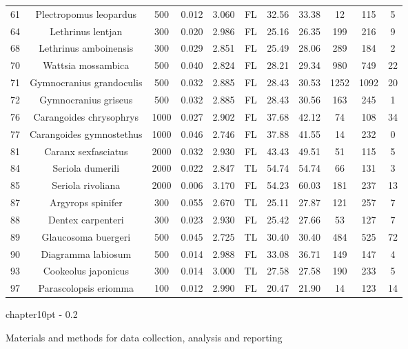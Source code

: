 \documentclass{report}\usepackage[]{graphicx}\usepackage[]{color}
\makeatletter
\renewcommand\chapter{\@startsection%
{chapter}{1}{0pt}%
{-\baselineskip}%
{0.2\baselineskip}%
{\raggedright\bf}}%
\makeatother
\begin{document}
\begin{table}[ht]
{\begin{tabular}{ccccccccccc}
  61 & Plectropomus leopardus & 500 & 0.012 & 3.060 & FL & 32.56 & 33.38 & 12 & 115 & 5 \\ 
  64 & Lethrinus lentjan & 300 & 0.020 & 2.986 & FL & 25.16 & 26.35 & 199 & 216 & 9 \\ 
  68 & Lethrinus amboinensis & 300 & 0.029 & 2.851 & FL & 25.49 & 28.06 & 289 & 184 & 2 \\ 
  70 & Wattsia mossambica & 500 & 0.040 & 2.824 & FL & 28.21 & 29.34 & 980 & 749 & 22 \\ 
  71 & Gymnocranius grandoculis & 500 & 0.032 & 2.885 & FL & 28.43 & 30.53 & 1252 & 1092 & 20 \\ 
  72 & Gymnocranius griseus & 500 & 0.032 & 2.885 & FL & 28.43 & 30.56 & 163 & 245 & 1 \\ 
  76 & Carangoides chrysophrys & 1000 & 0.027 & 2.902 & FL & 37.68 & 42.12 & 74 & 108 & 34 \\ 
  77 & Carangoides gymnostethus & 1000 & 0.046 & 2.746 & FL & 37.88 & 41.55 & 14 & 232 & 0 \\ 
  81 & Caranx sexfasciatus & 2000 & 0.032 & 2.930 & FL & 43.43 & 49.51 & 51 & 115 & 5 \\ 
  84 & Seriola dumerili & 2000 & 0.022 & 2.847 & TL & 54.74 & 54.74 & 66 & 131 & 3 \\ 
  85 & Seriola rivoliana & 2000 & 0.006 & 3.170 & FL & 54.23 & 60.03 & 181 & 237 & 13 \\ 
  87 & Argyrops spinifer & 300 & 0.055 & 2.670 & TL & 25.11 & 27.87 & 121 & 257 & 7 \\ 
  88 & Dentex carpenteri & 300 & 0.023 & 2.930 & FL & 25.42 & 27.66 & 53 & 127 & 7 \\ 
  89 & Glaucosoma buergeri & 500 & 0.045 & 2.725 & TL & 30.40 & 30.40 & 484 & 525 & 72 \\ 
  90 & Diagramma labiosum & 500 & 0.014 & 2.988 & FL & 33.08 & 36.71 & 149 & 147 & 4 \\ 
  93 & Cookeolus japonicus & 300 & 0.014 & 3.000 & TL & 27.58 & 27.58 & 190 & 233 & 5 \\ 
  97 & Parascolopsis eriomma & 100 & 0.012 & 2.990 & FL & 20.47 & 21.90 & 14 & 123 & 14 \\ 
   \hline
\end{tabular}
}
\end{table}


\clearpage
\newpage

\chapter{Materials and methods for data collection, analysis and reporting}

\end{document}
